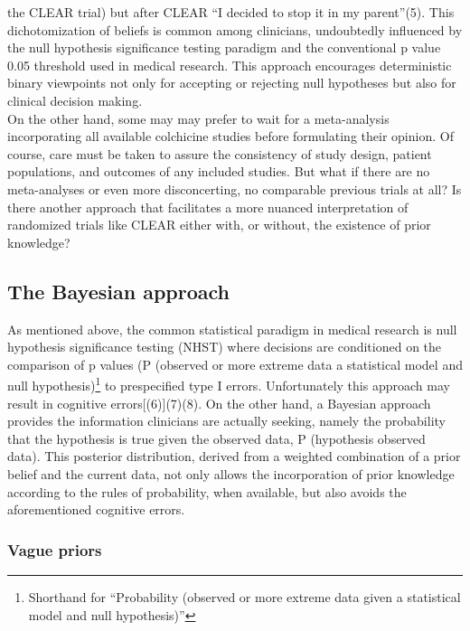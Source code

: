 \documentclass[
  letterpaper,
  DIV=11,
  numbers=noendperiod]{scrartcl}
\begin{document}
the CLEAR trial) but after CLEAR ``I decided to stop it in my
parent''(5). This dichotomization of beliefs is common among clinicians,
undoubtedly influenced by the null hypothesis significance testing
paradigm and the conventional p value 0.05 threshold used in medical
research. This approach encourages deterministic binary viewpoints not
only for accepting or rejecting null hypotheses but also for clinical
decision making.\\
On the other hand, some may may prefer to wait for a meta-analysis
incorporating all available colchicine studies before formulating their
opinion. Of course, care must be taken to assure the consistency of
study design, patient populations, and outcomes of any included studies.
But what if there are no meta-analyses or even more disconcerting, no
comparable previous trials at all? Is there another approach that
facilitates a more nuanced interpretation of randomized trials like
CLEAR either with, or without, the existence of prior knowledge?\\

\subsection{The Bayesian approach}\label{the-bayesian-approach}

As mentioned above, the common statistical paradigm in medical research
is null hypothesis significance testing (NHST) where decisions are
conditioned on the comparison of p values (P (observed or more extreme
data \textbar{} a statistical model and null hypothesis)\footnote{Shorthand
  for ``Probability (observed or more extreme data given a statistical
  model and null hypothesis)''} to prespecified type I errors.
Unfortunately this approach may result in cognitive
errors{[}(6){]}(7)(8). On the other hand, a Bayesian approach provides
the information clinicians are actually seeking, namely the probability
that the hypothesis is true given the observed data, P (hypothesis
\textbar{} observed data). This posterior distribution, derived from a
weighted combination of a prior belief and the current data, not only
allows the incorporation of prior knowledge according to the rules of
probability, when available, but also avoids the aforementioned
cognitive errors.

\subsubsection{Vague priors}\label{vague-priors}
\end{document}
